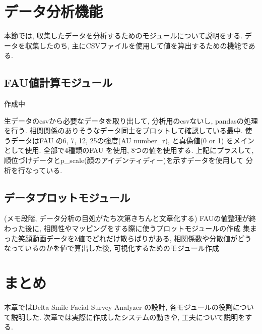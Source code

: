 \section{データ分析機能}
本節では, 収集したデータを分析するためのモジュールについて説明をする.
データを収集したのち, 主にCSVファイルを使用して値を算出するための機能である.

\subsection{FAU値計算モジュール}
作成中

生データのcsvから必要なデータを取り出して, 分析用のcsvないし, pandasの処理を行う.
相関関係のありそうなデータ同士をプロットして確認している最中.
使うデータはFAU の6, 7, 12, 25の強度(AU number\_r), と真偽値(0 or 1) をメインとして使用.
全部で4種類のFAU を使用, 8つの値を使用する.
上記にプラスして, 順位づけデータとp\_scale(顔のアイデンティディー)を示すデータを使用して
分析を行なっている.

\subsection{データプロットモジュール}
(メモ段階, データ分析の目処がたち次第きちんと文章化する)
FAUの値整理が終わった後に, 相関性やマッピングをする際に使うプロットモジュールの作成
集まった笑顔動画データをλ値でどれだけ散らばりがある, 相関係数や分散値がどうなっているのかを値で算出した後,
可視化するためのモジュール作成

\section{まとめ}
本章ではDelta Smile Facial Survey Analyzer の設計, 各モジュールの役割について説明した.
次章では実際に作成したシステムの動きや, 工夫について説明をする.
